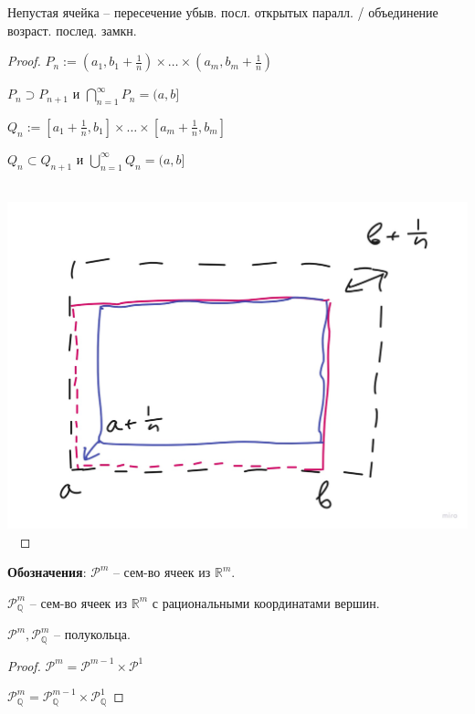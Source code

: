 \begin{theorem}
    Непустая ячейка -- пересечение убыв. посл. открытых паралл. / объединение возраст. послед. замкн.
\end{theorem}

\begin{proof}

    $P_n := (a_1, b_1 + \frac{1}{n}) \times \dots \times (a_m, b_m + \frac{1}{n})$

    $P_n \supset P_{n+1}$ и $\bigcap_{n=1}^{\infty}P_n = (a, b]$

    $Q_n := [a_1 + \frac{1}{n}, b_1] \times \dots \times [a_m + \frac{1}{n}, b_m]$

    $Q_n \subset Q_{n+1}$ и $\bigcup_{n=1}^{\infty}Q_n = (a, b]$ 

    \hbox{
        \includegraphics[scale=0.15]{./assets/01-measure-theory/rects-1.jpg}
    }

\end{proof}

\textbf{Обозначения}: $\mathcal{P}^m$ -- сем-во ячеек из $\mathbb{R}^m$.

$\mathcal{P}_{\mathbb{Q}}^{m}$ -- сем-во ячеек из $\mathbb{R}^m$ с рациональными координатами вершин.

\begin{theorem}
    $\mathcal{P}^m, \mathcal{P}^m_{\mathbb{Q}}$ -- полукольца.
\end{theorem}
\begin{proof}
    $\mathcal{P}^m = \mathcal{P}^{m-1} \times \mathcal{P}^1$

    $\mathcal{P}_{\mathbb{Q}}^m = \mathcal{P}_{\mathbb{Q}}^{m-1} \times \mathcal{P}_{\mathbb{Q}}^1$
\end{proof}

